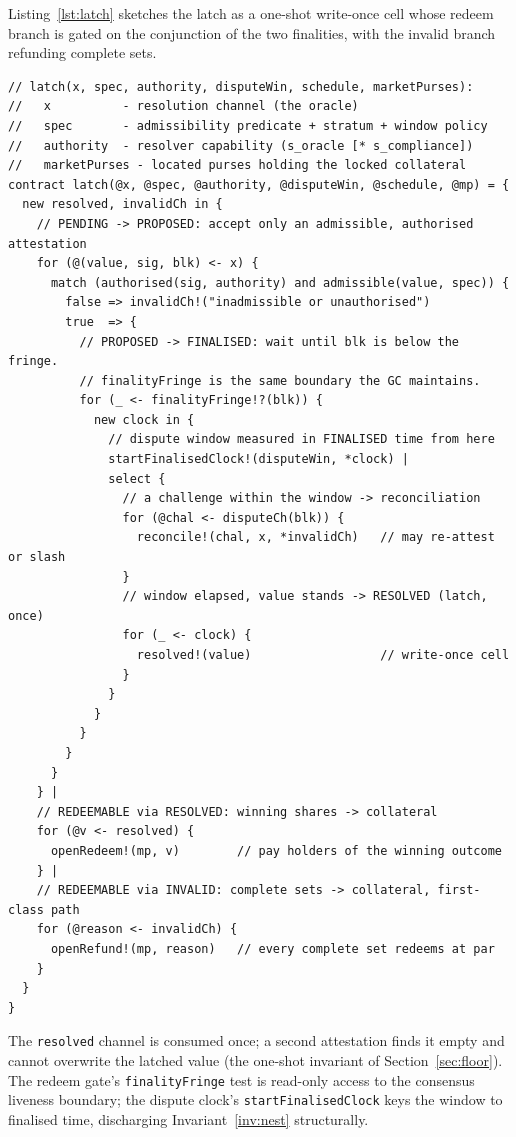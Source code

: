 \documentclass[11pt]{article}
\begin{document}
Listing~\ref{lst:latch} sketches the latch as a one-shot write-once cell whose redeem branch is
gated on the conjunction of the two finalities, with the invalid branch refunding complete sets.

\begin{lstlisting}[caption={The resolution latch: write-once, redeem nested below consensus
and dispute finality, invalid refunds complete sets.},label={lst:latch}]
// latch(x, spec, authority, disputeWin, schedule, marketPurses):
//   x          - resolution channel (the oracle)
//   spec       - admissibility predicate + stratum + window policy
//   authority  - resolver capability (s_oracle [* s_compliance])
//   marketPurses - located purses holding the locked collateral
contract latch(@x, @spec, @authority, @disputeWin, @schedule, @mp) = {
  new resolved, invalidCh in {
    // PENDING -> PROPOSED: accept only an admissible, authorised attestation
    for (@(value, sig, blk) <- x) {
      match (authorised(sig, authority) and admissible(value, spec)) {
        false => invalidCh!("inadmissible or unauthorised")
        true  => {
          // PROPOSED -> FINALISED: wait until blk is below the fringe.
          // finalityFringe is the same boundary the GC maintains.
          for (_ <- finalityFringe!?(blk)) {
            new clock in {
              // dispute window measured in FINALISED time from here
              startFinalisedClock!(disputeWin, *clock) |
              select {
                // a challenge within the window -> reconciliation
                for (@chal <- disputeCh(blk)) {
                  reconcile!(chal, x, *invalidCh)   // may re-attest or slash
                }
                // window elapsed, value stands -> RESOLVED (latch, once)
                for (_ <- clock) {
                  resolved!(value)                  // write-once cell
                }
              }
            }
          }
        }
      }
    } |
    // REDEEMABLE via RESOLVED: winning shares -> collateral
    for (@v <- resolved) {
      openRedeem!(mp, v)        // pay holders of the winning outcome
    } |
    // REDEEMABLE via INVALID: complete sets -> collateral, first-class path
    for (@reason <- invalidCh) {
      openRefund!(mp, reason)   // every complete set redeems at par
    }
  }
}
\end{lstlisting}

\noindent The \texttt{resolved} channel is consumed once; a second attestation finds it empty
and cannot overwrite the latched value (the one-shot invariant of Section~\ref{sec:floor}). The
redeem gate's \texttt{finalityFringe} test is read-only access to the consensus liveness
boundary; the dispute clock's \texttt{startFinalisedClock} keys the window to finalised time,
discharging Invariant~\ref{inv:nest} structurally.
\end{document}
